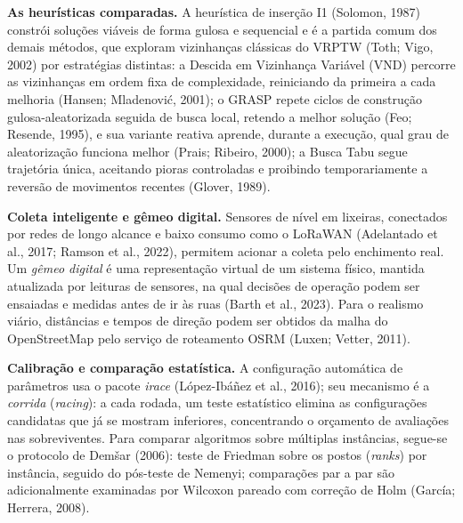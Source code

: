 \documentclass[10pt,a4paper]{article}
\begin{document}
\vspace{\baselineskip}
\textbf{As heurísticas comparadas.} A heurística de inserção I1 (Solomon, 1987) constrói soluções viáveis de forma gulosa e sequencial e é a partida comum dos demais métodos, que exploram vizinhanças clássicas do VRPTW (Toth; Vigo, 2002) por estratégias distintas: a Descida em Vizinhança Variável (VND) percorre as vizinhanças em ordem fixa de complexidade, reiniciando da primeira a cada melhoria (Hansen; Mladenovi\'c, 2001); o GRASP repete ciclos de construção gulosa-aleatorizada seguida de busca local, retendo a melhor solução (Feo; Resende, 1995), e sua variante reativa aprende, durante a execução, qual grau de aleatorização funciona melhor (Prais; Ribeiro, 2000); a Busca Tabu segue trajetória única, aceitando pioras controladas e proibindo temporariamente a reversão de movimentos recentes (Glover, 1989).

\vspace{\baselineskip}
\textbf{Coleta inteligente e gêmeo digital.} Sensores de nível em lixeiras, conectados por redes de longo alcance e baixo consumo como o LoRaWAN (Adelantado et al., 2017; Ramson et al., 2022), permitem acionar a coleta pelo enchimento real. Um \emph{gêmeo digital} é uma representação virtual de um sistema físico, mantida atualizada por leituras de sensores, na qual decisões de operação podem ser ensaiadas e medidas antes de ir às ruas (Barth et al., 2023). Para o realismo viário, distâncias e tempos de direção podem ser obtidos da malha do OpenStreetMap pelo serviço de roteamento OSRM (Luxen; Vetter, 2011).

\vspace{\baselineskip}
\textbf{Calibração e comparação estatística.} A configuração automática de parâmetros usa o pacote \textit{irace} (L\'opez-Ib\'a\~nez et al., 2016); seu mecanismo é a \emph{corrida} (\textit{racing}): a cada rodada, um teste estatístico elimina as configurações candidatas que já se mostram inferiores, concentrando o orçamento de avaliações nas sobreviventes. Para comparar algoritmos sobre múltiplas instâncias, segue-se o protocolo de Dem\v{s}ar (2006): teste de Friedman sobre os postos (\textit{ranks}) por instância, seguido do pós-teste de Nemenyi; comparações par a par são adicionalmente examinadas por Wilcoxon pareado com correção de Holm (Garc\'ia; Herrera, 2008).

\end{document}
